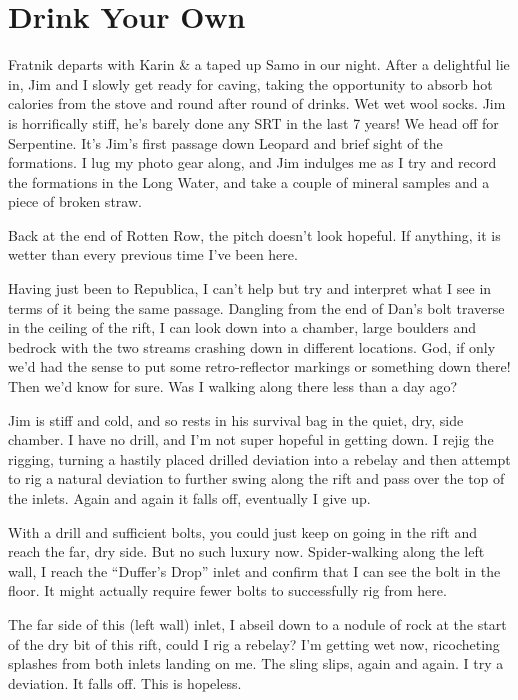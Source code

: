 
\section{Drink Your Own}\label{drink-your-own}

Fratnik departs with Karin \& a taped up Samo in our night. After a
delightful lie in, Jim and I slowly get ready for caving, taking the
opportunity to absorb hot calories from the stove and round after round
of drinks. Wet wet wool socks. Jim is horrifically stiff, he's barely
done any SRT in the last 7 years! We head off for Serpentine. It's Jim's
first passage down Leopard and brief sight of the formations. I lug my
photo gear along, and Jim indulges me as I try and record the formations
in the Long Water, and take a couple of mineral samples and a piece of
broken straw.

Back at the end of Rotten Row, the pitch doesn't look hopeful. If
anything, it is wetter than every previous time I've been here.

Having just been to Republica, I can't help but try and interpret what I
see in terms of it being the same passage. Dangling from the end of
Dan's bolt traverse in the ceiling of the rift, I can look down into a
chamber, large boulders and bedrock with the two streams crashing down
in different locations. God, if only we'd had the sense to put some
retro-reflector markings or something down there! Then we'd know for
sure. Was I walking along there less than a day ago?

Jim is stiff and cold, and so rests in his survival bag in the quiet,
dry, side chamber. I have no drill, and I'm not super hopeful in getting
down. I rejig the rigging, turning a hastily placed drilled deviation
into a rebelay and then attempt to rig a natural deviation to further
swing along the rift and pass over the top of the inlets. Again and
again it falls off, eventually I give up.

With a drill and sufficient bolts, you could just keep on going in the
rift and reach the far, dry side. But no such luxury now. Spider-walking
along the left wall, I reach the ``Duffer's Drop'' inlet and confirm
that I can see the bolt in the floor. It might actually require fewer
bolts to successfully rig from here.

The far side of this (left wall) inlet, I abseil down to a nodule of
rock at the start of the dry bit of this rift, could I rig a rebelay?
I'm getting wet now, ricocheting splashes from both inlets landing on
me. The sling slips, again and again. I try a deviation. It falls off.
This is hopeless.

